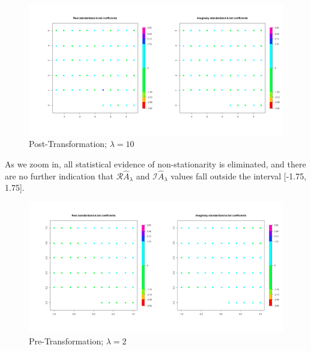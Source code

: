 \documentclass[print]{nuthesis}
\begin{document}
\begin{figure}[tbp]

{\centering \includegraphics[width=\linewidth,]{figure/Stationarity_Apost_l10_k10} 

}

\caption{Post-Transformation; $\lambda=10$}\label{fig:unnamed-chunk-2}
\end{figure}

As we zoom in, all statistical evidence of non-stationarity is eliminated, and there are no further indication that \(\mathscr{R} \hat{A}_\lambda\) and \(\mathscr{I} \hat{A}_\lambda\) values fall outside the interval {[}-1.75, 1.75{]}.

\begin{figure}[tbp]

{\centering \includegraphics[width=\linewidth,]{figure/Stationarity_Apre_l2_k10} 

}

\caption{Pre-Transformation; $\lambda=2$}\label{fig:unnamed-chunk-3}
\end{figure}
\end{document}
